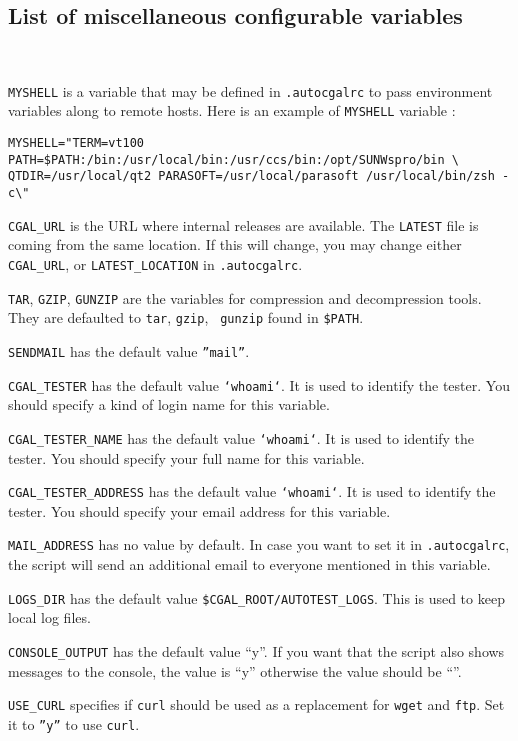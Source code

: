 \subsection{List of miscellaneous configurable variables} ~

{\tt MYSHELL} is a variable that may be defined in {\tt .autocgalrc}
to pass environment variables along to remote hosts. Here is an example of {\tt MYSHELL}
variable :
\begin{verbatim}
MYSHELL="TERM=vt100 PATH=$PATH:/bin:/usr/local/bin:/usr/ccs/bin:/opt/SUNWspro/bin \
QTDIR=/usr/local/qt2 PARASOFT=/usr/local/parasoft /usr/local/bin/zsh -c\"
\end{verbatim}

{\tt CGAL\_URL} is the URL where internal releases are available.
The {\tt LATEST} file is coming from the same location. If this will change,
you may change either {\tt CGAL\_URL}, or {\tt LATEST\_LOCATION}
in {\tt .autocgalrc}.

{\tt TAR}, {\tt GZIP}, {\tt GUNZIP} are the variables for compression and
decompression tools.  They are defaulted to {\tt tar}, {\tt gzip}, {\tt
gunzip} found in {\tt \$PATH}.

{\tt SENDMAIL} has the default value {\tt ''mail''}.

{\tt CGAL\_TESTER} has the default value {\tt `whoami`}.  It is used to
identify the tester.  You should specify a kind of login name for this
variable.

{\tt CGAL\_TESTER\_NAME} has the default value {\tt `whoami`}.  It is used to
identify the tester.  You should specify your full name for this variable.

{\tt CGAL\_TESTER\_ADDRESS} has the default value {\tt `whoami`}.  It is used
to identify the tester.  You should specify your email address for this
variable.

{\tt MAIL\_ADDRESS} has no value by default. In case you want to
set it in {\tt .autocgalrc}, the script will send an additional email to
everyone mentioned in this variable.

{\tt LOGS\_DIR} has the default value {\tt \$CGAL\_ROOT/AUTOTEST\_LOGS}.  This
is used to keep local log files.

{\tt CONSOLE\_OUTPUT} has the default value ``y''. If you want that the script
 also shows messages to the console, the value is ``y'' otherwise the value
should be ``''.

{\tt USE\_CURL} specifies if {\tt curl} should be used as a replacement for
{\tt wget} and {\tt ftp}.  Set it to {\tt ''y''} to use {\tt curl}.

